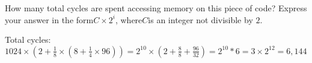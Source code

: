 \begin{blocksection}
\question
How many total cycles are spent accessing memory on this piece of code? Express your answer in the form ​$C \times 2^{i}$​ ​, where ​$C$​ is an integer not divisible by $2$.

\begin{solution}[0.7in]
Total cycles: ​$1024 \times (2 + \frac{1}{8} \times (8 + \frac{1}{4} \times 96)) = 2^{10} \times (2 + \frac{8}{8} + \frac{96}{32}) = 2^{10} * 6 = 3 \times 2^{12} = 6,144$
\end{solution}
\end{blocksection}